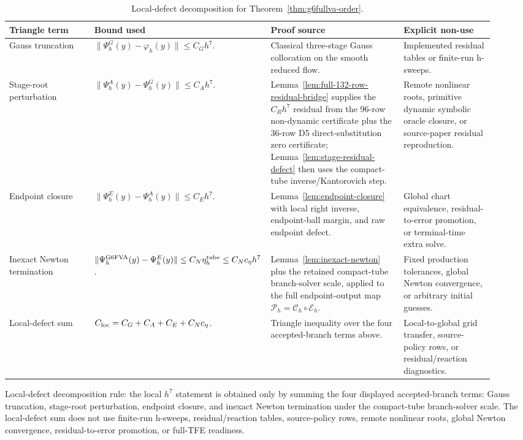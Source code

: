 \documentclass[preprint,12pt]{elsarticle}
\newcommand{\tfe}{TFE}
\begin{document}
\begin{table}[htbp]
\centering
\caption{Local-defect decomposition for
Theorem~\ref{thm:g6fullva-order}.}
\label{tab:local-defect-decomposition-ledger}
\scriptsize
\setlength{\tabcolsep}{2pt}
\renewcommand{\arraystretch}{0.9}
\begin{tabular}{P{0.18\linewidth}P{0.27\linewidth}P{0.28\linewidth}P{0.19\linewidth}}
\toprule
Triangle term & Bound used & Proof source & Explicit non-use \\
\midrule
Gauss truncation &
\(\|\Psi_h^G(y)-\varphi_h(y)\|\le C_Gh^7\). &
Classical three-stage Gauss collocation on the smooth reduced flow. &
Implemented residual tables or finite-run h-sweeps. \\
Stage-root perturbation &
\(\|\Psi_h^A(y)-\Psi_h^G(y)\|\le C_Ah^7\). &
Lemma~\ref{lem:full-132-row-residual-bridge} supplies the \(C_Rh^7\)
residual from the 96-row non-dynamic certificate plus the 36-row D5
direct-substitution zero certificate; Lemma~\ref{lem:stage-residual-defect}
then uses the compact-tube inverse/Kantorovich step. &
Remote nonlinear roots, primitive dynamic symbolic oracle closure, or source-paper
residual reproduction. \\
Endpoint closure &
\(\|\Psi_h^E(y)-\Psi_h^A(y)\|\le C_Eh^7\). &
Lemma~\ref{lem:endpoint-closure} with local right inverse, endpoint-ball
margin, and raw endpoint defect. &
Global chart equivalence, residual-to-error promotion, or terminal-time
extra solve. \\
Inexact Newton termination &
\(\|\Psi_h^{\mathrm{G6FVA}}(y)-\Psi_h^E(y)\|\le
C_N\eta_h^{\rm tube}\le C_Nc_\eta h^7\). &
Lemma~\ref{lem:inexact-newton} plus the retained compact-tube branch-solver
scale, applied to the full endpoint-output map
\(\mathcal P_h=\mathcal C_h\circ\mathcal E_h\). &
Fixed production tolerances, global Newton convergence, or arbitrary
initial guesses. \\
Local-defect sum &
\(C_{\rm loc}=C_G+C_A+C_E+C_Nc_\eta\). &
Triangle inequality over the four accepted-branch terms above. &
Local-to-global grid transfer, source-policy rows, or residual/reaction
diagnostics. \\
\bottomrule
\end{tabular}
\end{table}

Local-defect decomposition rule: the local \(h^7\)
statement is obtained only by summing the four displayed accepted-branch
terms: Gauss truncation, stage-root perturbation, endpoint closure, and
inexact Newton termination under the compact-tube branch-solver scale. The
local-defect sum does not use finite-run h-sweeps, residual/reaction
tables, source-policy rows, remote nonlinear roots, global Newton
convergence, residual-to-error promotion, or full-\tfe{} readiness.
\end{document}
